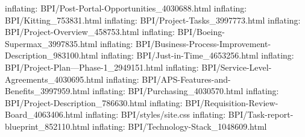 \documentclass[letterpaper,10pt,english]{sphinxmanual}
\begin{document}
\begin{description}
inflating: BPI/Post-Portal-Opportunities\_4030688.html
inflating: BPI/Kitting\_753831.html
inflating: BPI/Project-Tasks\_3997773.html
inflating: BPI/Project-Overview\_458753.html
inflating: BPI/Boeing-Supermax\_3997835.html
inflating: BPI/Business-Process-Improvement-Description\_983100.html
inflating: BPI/Just-in-Time\_4653256.html
inflating: BPI/Project-Plan—Phase-1\_2949151.html
inflating: BPI/Service-Level-Agreements\_4030695.html
inflating: BPI/APS-Features-and-Benefits\_3997959.html
inflating: BPI/Purchasing\_4030570.html
inflating: BPI/Project-Description\_786630.html
inflating: BPI/Requisition-Review-Board\_4063406.html
inflating: BPI/styles/site.css
inflating: BPI/Task-report-blueprint\_852110.html
inflating: BPI/Technology-Stack\_1048609.html

\end{description}



\renewcommand{\indexname}{Index}
\printindex
\end{document}
